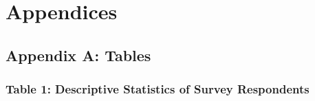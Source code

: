 \section{Appendices}

\hypertarget{appendix-a}{\subsection{Appendix A: Tables}}

\hypertarget{table-1}{\subsubsection[Table 1: Descriptive Statistics of \texorpdfstring{\\}{} Survey
  Respondents]{Table 1: Descriptive Statistics of Survey
  Respondents}}

